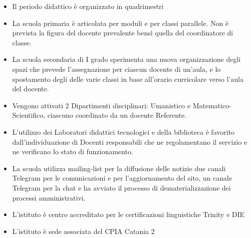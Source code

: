 \documentclass[12pt,a4paper,oneside]{memoir}
\begin{document}
\begin{itemize}
    \item Il periodo didattico è organizzato in quadrimestri
    \item La scuola primaria è articolata per moduli e per classi parallele. Non è prevista la figura del docente prevalente bensì quella del coordinatore di classe.
    \item La scuola secondaria di I grado sperimenta una nuova organizzazione degli spazi che prevede l’assegnazione per ciascun docente di un’aula, e lo spostamento degli delle varie classi in base all'orario curricolare verso l’aula del docente.
    \item Vengono attivati 2 Dipartimenti disciplinari: Umanistico e Matematico-Scientifico, ciascuno coordinato da un docente Referente.
    \item L'utilizzo dei Laboratori didattici tecnologici e della biblioteca è favorito dall'individuazione di Docenti responsabili che ne regolamentano il servizio e ne verificano lo stato di funzionamento.
    \item La scuola utilizza mailing-list per la diffusione delle notizie due canali Telegram per le comunicazioni e per l'aggiornamento del sito, un canale Telegram per la chat  e   ha   avviato   il   processo   di dematerializzazione dei processi amministrativi.
    \item L'istituto è centro accreditato per le certificazioni linguistiche Trinity e DIE
    \item L'istituto è sede associata del CPIA Catania 2
\end{itemize}
\end{document}
